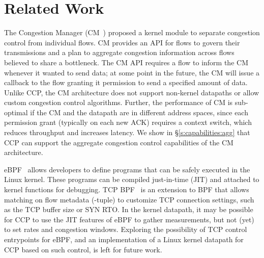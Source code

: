 \section{Related Work}
\label{s:relwork}
The Congestion Manager (CM~\cite{cm}) proposed a kernel module to separate congestion control from individual flows. CM provides an API for flows to govern their transmissions and a plan to aggregate congestion information across flows believed to share a bottleneck. The CM API requires a flow to inform the CM whenever it wanted to send data; at some point in the future, the CM will issue a callback to the flow granting it permission to send a specified amount of data. Unlike CCP, the CM architecture does not support non-kernel datapaths or allow custom congestion control algorithms. Further, the performance of CM is sub-optimal if the CM and the datapath are in different address spaces, since %
each permission grant (typically on each new ACK) requires a context switch, which reduces throughput and increases latency. We show in \S\ref{s:capabilities:agg} that CCP can support the aggregate congestion control capabilities of the CM architecture.



eBPF~\cite{ebpf} allows developers to define programs that can be safely executed in the Linux kernel. These programs can be compiled just-in-time (JIT) and attached to kernel functions for debugging. TCP BPF~\cite{tcpbpf} is an extension to BPF that allows matching on flow metadata (-tuple) to customize TCP connection settings, such as the TCP buffer size or SYN RTO.
In the kernel datapath, it may be possible for CCP to use the JIT features of eBPF to gather measurements, but not (yet) to set rates and congestion windows.
Exploring the possibility of TCP control entrypoints for eBPF, and an implementation of a Linux kernel datapath for CCP based on such control, is left for future work.

